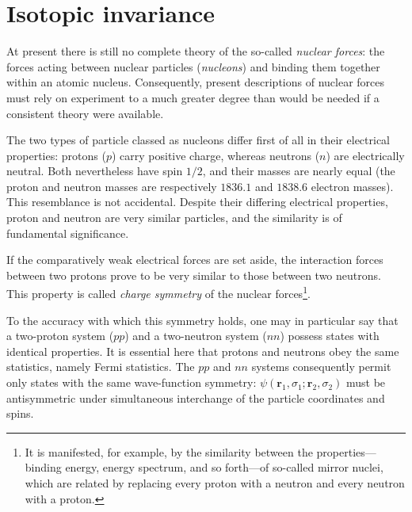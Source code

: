 \section{Isotopic invariance}

At present there is still no complete theory of the so-called \emph{nuclear forces}: the forces acting between nuclear particles (\emph{nucleons}) and binding them together within an atomic nucleus. Consequently, present descriptions of nuclear forces must rely on experiment to a much greater degree than would be needed if a consistent theory were available.

The two types of particle classed as nucleons differ first of all in their electrical properties: protons ($p$) carry positive charge, whereas neutrons ($n$) are electrically neutral. Both nevertheless have spin $1/2$, and their masses are nearly equal (the proton and neutron masses are respectively $1836{.}1$ and $1838{.}6$ electron masses). This resemblance is not accidental. Despite their differing electrical properties, proton and neutron are very similar particles, and the similarity is of fundamental significance.

If the comparatively weak electrical forces are set aside, the interaction forces between two protons prove to be very similar to those between two neutrons. This property is called \emph{charge symmetry} of the nuclear forces\footnote{It is manifested, for example, by the similarity between the properties---binding energy, energy spectrum, and so forth---of so-called mirror nuclei, which are related by replacing every proton with a neutron and every neutron with a proton.}.

To the accuracy with which this symmetry holds, one may in particular say that a two-proton system ($pp$) and a two-neutron system ($nn$) possess states with identical properties. It is essential here that protons and neutrons obey the same statistics, namely Fermi statistics. The $pp$ and $nn$ systems consequently permit only states with the same wave-function symmetry: $\psi(\mathbf r_1,\sigma_1;\mathbf r_2,\sigma_2)$ must be antisymmetric under simultaneous interchange of the particle coordinates and spins.

